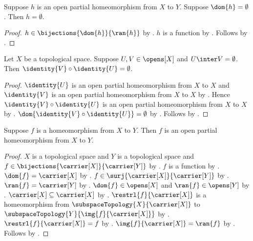 \begin{theorem}\label{open_partial_homeomorphism_empty_domain}
    Suppose $h$ is an open partial homeomorphism from $X$ to $Y$.
    Suppose $\dom{h}=\emptyset$.
    Then $h=\emptyset$.
\end{theorem}
\begin{proof}
    $h\in\bijections{\dom{h}}{\ran{h}}$ by
        .
    $h$ is a function by .
    Follows by .
\end{proof}

\begin{corollary}\label{disjoint_open_identity_composition}
    Let $X$ be a topological space.
    Suppose $U,V\in\opens[X]$ and $U\inter V=\emptyset$.
    Then $\identity{V}\circ\identity{U}=\emptyset$.
\end{corollary}
\begin{proof}
    $\identity{U}$ is an open partial homeomorphism from $X$ to $X$ and
        $\identity{V}$ is an open partial homeomorphism from $X$ to $X$ by
        .
    Hence $\identity{V}\circ\identity{U}$ is an open partial homeomorphism
        from $X$ to $X$ by .
    $\dom{\identity{V}\circ\identity{U}}=\emptyset$ by
        .
    Follows by .
\end{proof}

\begin{theorem}\label{homeomorphism_is_open_partial_homeomorphism}
    Suppose $f$ is a homeomorphism from $X$ to $Y$.
    Then $f$ is an open partial homeomorphism from $X$ to $Y$.
\end{theorem}
\begin{proof}
    $X$ is a topological space and $Y$ is a topological space and
        $f\in\bijections{\carrier[X]}{\carrier[Y]}$ by .
    $f$ is a function by .
    $\dom{f}=\carrier[X]$ by .
    $f\in\surj{\carrier[X]}{\carrier[Y]}$ by .
    $\ran{f}=\carrier[Y]$ by .
    $\dom{f}\in\opens[X]$ and $\ran{f}\in\opens[Y]$ by .
    $\carrier[X]\subseteq\carrier[X]$ by .
    $\restrl{f}{\carrier[X]}$ is a homeomorphism from
        $\subspaceTopology{X}{\carrier[X]}$ to
        $\subspaceTopology{Y}{\img{f}{\carrier[X]}}$ by
        .
    $\restrl{f}{\carrier[X]}=f$ by .
    $\img{f}{\carrier[X]}=\ran{f}$ by .
    Follows by .
\end{proof}

